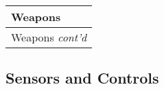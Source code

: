 \documentclass[twoside]{book}
\begin{document}
\begin{longtable}{p{1.25in}} 
  Weapons\\
  \hline
  \hline
  \endfirsthead
  Weapons \textit{cont'd}
         \\
  \hline
  \endhead

\end{longtable}
    
\begin{multicols}{2}


\hspace{-3.75ex}
\vspace{1ex}


    
\end{multicols}
  
    

\subsection{Sensors and Controls}
    
\end{document}
